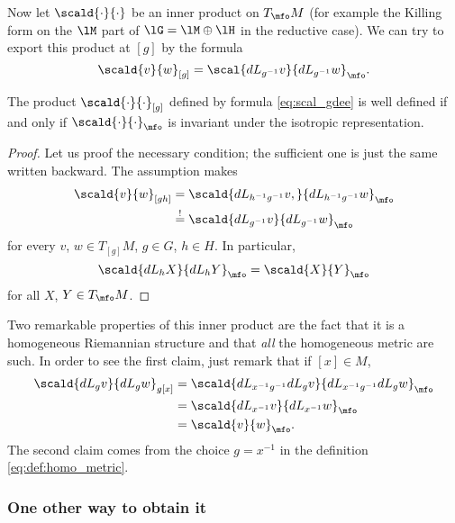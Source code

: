 Now let $\scald{\cdot}{\cdot}$ be an inner product on $T_{\mfo}M$ (for example the Killing form on the $\lM$ part of $\lG=\lM\oplus\lH$ in the reductive case). We can try to export this product at $[g]$ by the formula 
\begin{equation}\label{eq:scal_gdee}
  \scald{v}{w}_{[g]}=\scal{dL_{g^{-1}}v}{dL_{g^{-1}}w}_{\mfo}.
\end{equation}

\begin{proposition}
The product $\scald{\cdot}{\cdot}_{[g]}$ defined by formula \eqref{eq:scal_gdee} is well defined if and only if $\scald{\cdot}{\cdot}_{\mfo}$ is invariant under the isotropic representation.
\end{proposition}

\begin{proof}
Let us proof the necessary condition; the sufficient one is just the same written backward. The assumption makes 
\begin{equation}
\begin{split}
  \scald{v}{w}_{[gh]}&=\scald{dL_{h^{-1} g^{-1}}v,}{dL_{h^{-1} g^{-1}}w}_{\mfo}\\
                     &\stackrel{!}{=}\scald{dL_{g^{-1}}v}{dL_{g^{-1}}w}_{\mfo}
\end{split}
\end{equation}
for every $v$, $w\in T_{[g]}M$, $g\in G$, $h\in H$. In particular,
\[
   \scald{dL_h X}{dL_hY}_{\mfo}=\scald{X}{Y}_{\mfo}
\]
for all $X$, $Y\in T_{\mfo}M$.
\end{proof}

Two remarkable properties of this inner product are the fact that it is a homogeneous Riemannian structure and that \emph{all} the homogeneous metric are such. In order to see the first claim, just remark that if $[x]\in M$,
\begin{equation}
\begin{split}
\scald{dL_gv}{dL_gw}_{g[x]}&=\scald{dL_{x^{-1} g^{-1}}dL_gv}{dL_{x^{-1} g^{-1}}dL_gw}_{\mfo}\\
                           &=\scald{dL_{x^{-1}}v}{dL_{x^{-1}}w}_{\mfo}\\
                           &=\scald{v}{w}_{\mfo}.
\end{split}
\end{equation}
The second claim comes from the choice $g=x^{-1}$ in the definition \eqref{eq:def:homo_metric}.

\subsubsection{One other way to obtain it}
\label{SubSubSecTheKillingHomo}

